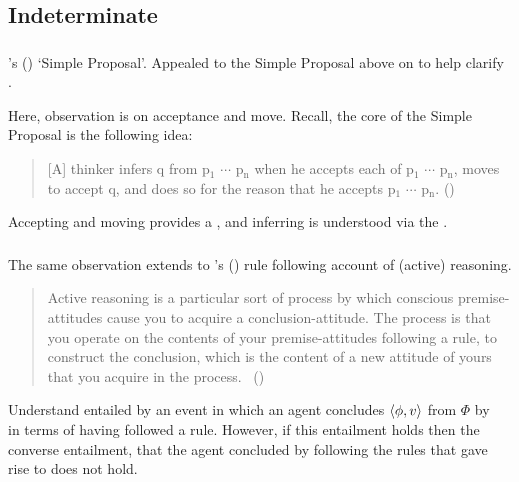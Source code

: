 \subsection{Indeterminate}
\label{cha:var:sec:indeterminate}

\subsubsection{\textcite{Wright:2014tt}}

\begin{note}
  \citeauthor{Wright:2014tt}'s (\citeyear{Wright:2014tt}) `Simple Proposal'.
  Appealed to the Simple Proposal above on  to help clarify \supportI{}.

  Here, observation is on acceptance and move.
  Recall, the core of the Simple Proposal is the following idea:

  \begin{quote}
    [A] thinker infers q from p\(_{1}\) \(\cdots\) p\(_{\text{n}}\) when he accepts each of p\(_{1}\) \(\cdots\) p\(_{\text{n}}\), moves to accept q, and does so for the reason that he accepts p\(_{1}\) \(\cdots\) p\(_{\text{n}}\).%
    \mbox{}\hfill\mbox{(\citeyear[33]{Wright:2014tt})}
  \end{quote}

  Accepting and moving provides a \wit{}, and inferring is understood via the \wit{}.
\end{note}

\subsubsection{\textcite{Broome:2002aa}}

\begin{note}
  The same observation extends to \citeauthor{Broome:2002aa}'s (\citeyear{Broome:2013aa}) rule following account of (active) reasoning.

  \begin{quote}
    Active reasoning is a particular sort of process by which conscious premise-attitudes cause you to acquire a conclusion-attitude.
    The process is that you operate on the contents of your premise-attitudes following a rule, to construct the conclusion, which is the content of a new attitude of yours that you acquire in the process.\newline
    \mbox{ }\hfill\mbox{(\citeyear[234]{Broome:2002aa})}
  \end{quote}

  Understand  entailed by an event in which an agent concludes \(\langle \phi, v \rangle\) from \(\Phi\) by~\supportI{} in terms of having followed a rule.
  However, if this entailment holds then the converse entailment, that the agent concluded by following the rules that gave rise to  does not hold.
\end{note}

